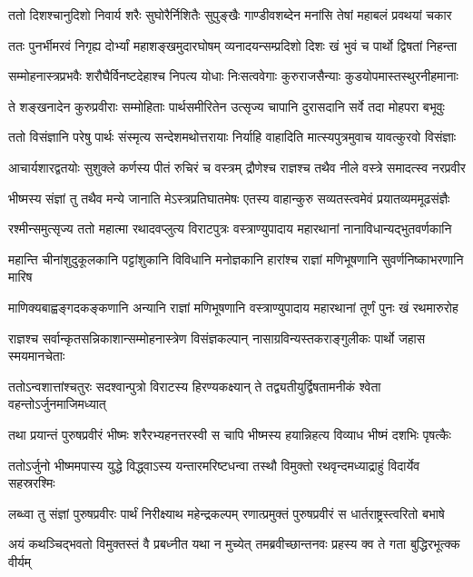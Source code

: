 \twolineshloka
{ततो दिशश्चानुदिशो निवार्य शरैः सुघोरैर्निशितैः सुपुङ्खैः}
{गाण्डीवशब्देन मनांसि तेषां महाबलं प्रवथयां चकार}


\twolineshloka
{ततः पुनर्भीमरवं निगृह्य दोर्भ्यां महाशङ्खमुदारघोषम्}
{व्यनादयन्सम्प्रदिशो दिशः खं भुवं च पार्थो द्विषतां निहन्ता}


\twolineshloka
{सम्मोहनास्त्रप्रभवैः शरौघैर्विनष्टदेहाश्च निपत्य योधाः}
{निःसत्ववेगाः कुरुराजसैन्याः कुडयोपमास्तस्थुरनीहमानाः}


\twolineshloka
{ते शङ्खनादेन कुरुप्रवीराः सम्मोहिताः पार्थसमीरितेन}
{उत्सृज्य चापानि दुरासदानि सर्वे तदा मोहपरा बभूवुः}


\twolineshloka
{ततो विसंज्ञानि परेषु पार्थः संस्मृत्य सन्देशमथोत्तरायाः}
{निर्याहि वाहादिति मात्स्यपुत्रमुवाच यावत्कुरवो विसंज्ञाः}


\twolineshloka
{आचार्यशारद्वतयोः सुशुक्ले कर्णस्य पीतं रुचिरं च वस्त्रम्}
{द्रौणेश्च राज्ञश्च तथैव नीले वस्त्रे समादत्स्व नरप्रवीर}


\twolineshloka
{भीष्मस्य संज्ञां तु तथैव मन्ये जानाति मेऽस्त्रप्रतिघातमेषः}
{एतस्य वाहान्कुरु सव्यतस्त्वमेवं प्रयातव्यममूढसंज्ञैः}


\twolineshloka
{रश्मीन्समुत्सृज्य ततो महात्मा रथादवप्लुत्य विराटपुत्रः}
{वस्त्राण्युपादाय महारथानां नानाविधान्यद्भुतवर्णकानि}


\twolineshloka
{महान्ति चीनांशुदुकूलकानि पट्टांशुकानि विविधानि मनोज्ञकानि}
{हारांश्च राज्ञां मणिभूषणानि सुवर्णनिष्काभरणानि मारिष}


\twolineshloka
{माणिक्यबाह्वङ्गदकङ्कणानि अन्यानि राज्ञां मणिभूषणानि}
{वस्त्राण्युपादाय महारथानां तूर्णं पुनः खं रथमारुरोह}


\twolineshloka
{राज्ञश्च सर्वान्कृतसन्निकाशान्सम्मोहनास्त्रेण विसंज्ञकल्पान्}
{नासाग्रविन्यस्तकराङ्गुलीकः पार्थो जहास स्मयमानचेताः}


\twolineshloka
{ततोऽन्वशात्तांश्चतुरः सदश्वान्पुत्रो विराटस्य हिरण्यकक्ष्यान्}
{ते तद्व्यतीयुर्द्विषतामनीकं श्वेता वहन्तोऽर्जुनमाजिमध्यात्}


\twolineshloka
{तथा प्रयान्तं पुरुषप्रवीरं भीष्मः शरैरभ्यहनत्तरस्वी}
{स चापि भीष्मस्य हयान्निहत्य विव्याध भीष्मं दशभिः पृषत्कैः}


\twolineshloka
{ततोऽर्जुनो भीष्ममपास्य युद्धे विद्ध्वाऽस्य यन्तारमरिष्टधन्वा}
{तस्थौ विमुक्तो रथवृन्दमध्याद्राहुं विदार्येव सहस्ररश्मिः}


\twolineshloka
{लब्ध्वा तु संज्ञां पुरुषप्रवीरः पार्थं निरीक्ष्याथ महेन्द्रकल्पम्}
{रणात्प्रमुक्तं पुरुषप्रवीरं स धार्तराष्ट्रस्त्वरितो बभाषे}


\twolineshloka
{अयं कथञ्चिद्भवतो विमुक्तस्तं वै प्रबध्नीत यथा न मुच्येत्}
{तमब्रवीच्छान्तनवः प्रहस्य क्व ते गता बुद्धिरभूत्क्क वीर्यम्}


